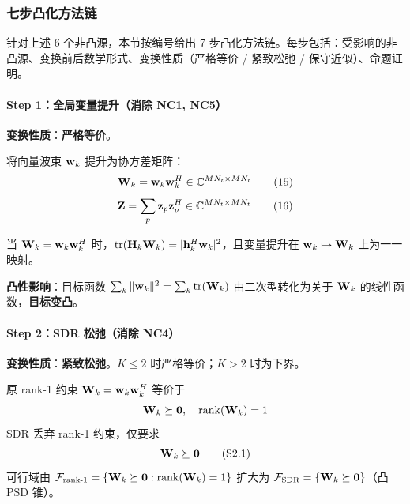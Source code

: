 \subsubsection{七步凸化方法链}

针对上述 6 个非凸源，本节按编号给出 7 步凸化方法链。每步包括：受影响的非凸源、变换前后数学形式、变换性质（严格等价 / 紧致松弛 / 保守近似）、命题证明。

\paragraph{Step 1：全局变量提升（消除 NC1, NC5）}
\textbf{变换性质}：\textbf{严格等价}。

将向量波束 $\mathbf{w}_k$ 提升为协方差矩阵：
\begin{equation}
\mathbf{W}_k = \mathbf{w}_k \mathbf{w}_k^H \in \mathbb{C}^{MN_t \times MN_t} \tag{15}
\end{equation}
\begin{equation}
\mathbf{Z} = \sum_p \mathbf{z}_p \mathbf{z}_p^H \in \mathbb{C}^{MN_t \times MN_t} \tag{16}
\end{equation}

\begin{proposition}[变量提升等价性]\label{prop:lifting}
当 $\mathbf{W}_k = \mathbf{w}_k \mathbf{w}_k^H$ 时，$\text{tr}(\mathbf{H}_k \mathbf{W}_k) = |\mathbf{h}_k^H \mathbf{w}_k|^2$，且变量提升在 $\mathbf{w}_k \mapsto \mathbf{W}_k$ 上为一一映射。
\end{proposition}

\textbf{凸性影响}：目标函数 $\sum_k \|\mathbf{w}_k\|^2 = \sum_k \text{tr}(\mathbf{W}_k)$ 由二次型转化为关于 $\mathbf{W}_k$ 的线性函数，\textbf{目标变凸}。

\paragraph{Step 2：SDR 松弛（消除 NC4）}
\textbf{变换性质}：\textbf{紧致松弛}。$K\leq 2$ 时严格等价；$K>2$ 时为下界。

原 rank-1 约束 $\mathbf{W}_k = \mathbf{w}_k \mathbf{w}_k^H$ 等价于
\begin{equation}
\mathbf{W}_k \succeq \mathbf{0}, \quad \operatorname{rank}(\mathbf{W}_k) = 1
\end{equation}
SDR 丢弃 rank-1 约束，仅要求
\begin{equation}
\mathbf{W}_k \succeq \mathbf{0} \tag{S2.1}
\end{equation}
可行域由 $\mathcal{F}_{\text{rank-1}} = \{\mathbf{W}_k \succeq \mathbf{0} : \operatorname{rank}(\mathbf{W}_k)=1\}$ 扩大为 $\mathcal{F}_{\text{SDR}} = \{\mathbf{W}_k \succeq \mathbf{0}\}$（凸 PSD 锥）。

